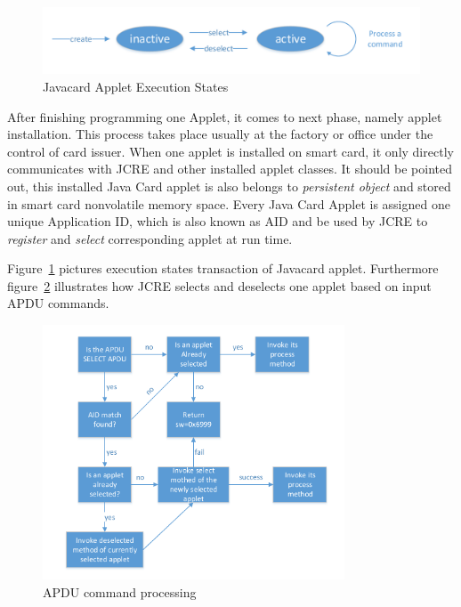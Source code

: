 \documentclass[]{llncs}
\begin{document}
\begin{figure}[!htbp]
	\centering
	\includegraphics[width=1\textwidth]{applet-execution-states}
		\caption[ ]{Javacard Applet Execution States\cite{handbuch}}
	\label{fig:applet-execution-states}
\end{figure}
After finishing programming one Applet, it comes to next phase, namely applet installation. This process takes place usually at the factory or office under the control of card issuer. When one applet is installed on smart card, it only directly communicates with JCRE and other installed applet classes. It should be pointed out, this installed Java Card applet is also belongs to \emph{persistent object} and stored in smart card nonvolatile memory space. Every Java Card Applet is assigned one unique Application ID, which is also known as AID and be used by JCRE to \emph{register} and \emph{select} corresponding applet at run time.

Figure~\ref{fig:applet-execution-states} pictures execution states transaction of Javacard applet. Furthermore figure~\ref{fig:apdu-command-processing} illustrates how JCRE selects and deselects one applet based on input APDU commands.

\begin{figure}[!htbp]
	\centering
	\includegraphics[width=0.8\textwidth]{apdu-command-processing}
		\caption[ ]{APDU command processing\cite{handbuch}}
	\label{fig:apdu-command-processing}
\end{figure}
\end{document}
